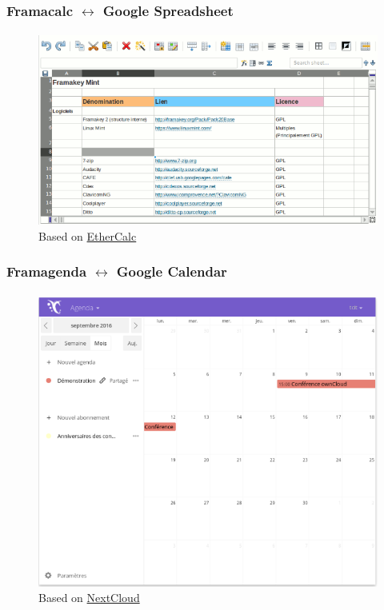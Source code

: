 	\begin{frame}
	\frametitle{Framacalc $\leftrightarrow$ Google Spreadsheet}
	\framesubtitle{}
	        \begin{figure}[h]
                \centering
                \includegraphics[width=.8\textwidth]{../pics/framacalc}
		\caption{Based on \href{https://ethercalc.net}{EtherCalc}}
        	\end{figure}
	\end{frame}

	\begin{frame}
	\frametitle{Framagenda $\leftrightarrow$ Google Calendar}
	\framesubtitle{}
	        \begin{figure}[h]
                \centering
                \includegraphics[width=.8\textwidth]{../pics/framagenda}
		\caption{Based on \href{https://nextcloud.com}{NextCloud}}
        	\end{figure}
	\end{frame}

